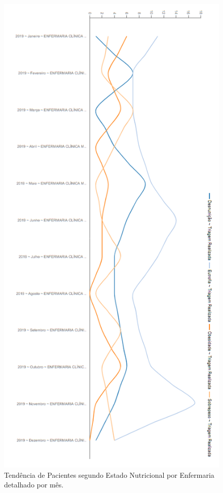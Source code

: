 \begin{figure}[htb]
	\caption{\label{dashboard_PercentualPacienteEstadoNutricionalEnfermariaMesPizza}Tendência de Pacientes segundo Estado Nutricional por Enfermaria detalhado por mês.}
	\begin{center}
	    \includegraphics[scale=0.65]{Imagens/3.4.PercentualPacienteEstadoNutricionalEnfermariaMesPizza.png}
	\end{center}
\end{figure}

